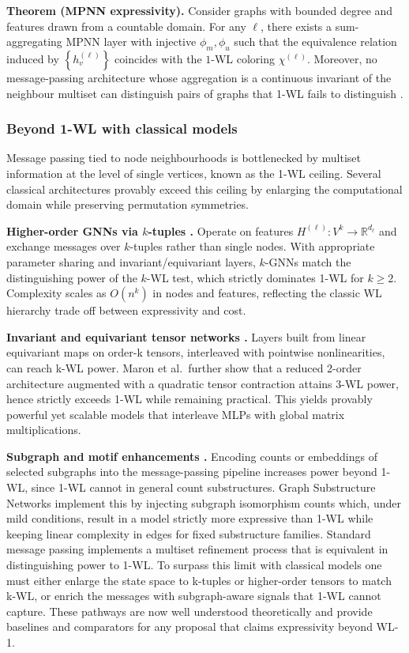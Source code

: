 \documentclass[11pt]{article}
\begin{document}
\textbf{Theorem (MPNN expressivity)\citep{xu2019howpowerful,morris2019wl}.} Consider graphs with bounded degree and features drawn from a countable domain. For any $\ell$, there exists a sum-aggregating MPNN layer with injective $\phi_m, \phi_u$ such that the equivalence relation induced by $\left\{h_v^{(\ell)}\right\}$ coincides with the $1$-WL coloring $\chi^{(\ell)}$. Moreover, no message-passing architecture whose aggregation is a continuous invariant of the neighbour multiset can distinguish pairs of graphs that 1-WL fails to distinguish .

\subsubsection{Beyond 1-WL with classical models}

Message passing tied to node neighbourhoods is bottlenecked by multiset information at the level of single vertices, known as the 1-WL ceiling. Several classical architectures provably exceed this ceiling by enlarging the computational domain while preserving permutation symmetries.

\textbf{Higher-order GNNs via $k$-tuples \citep{morris2019wl}.} Operate on features $H^{(\ell)}: V^k \rightarrow \mathbb{R}^{d_{\ell}}$ and exchange messages over $k$-tuples rather than single nodes. With appropriate parameter sharing and invariant/equivariant layers, $k$-GNNs match the distinguishing power of the $k$-WL test, which strictly dominates 1-WL for $k \geq 2$. Complexity scales as $O\left(n^k\right)$ in nodes and features, reflecting the classic WL hierarchy trade off between expressivity and cost. 

\textbf{Invariant and equivariant tensor networks \citep{maron2019invariant,maron2019provably}.} Layers built from linear equivariant maps on order-k tensors, interleaved with pointwise nonlinearities, can reach k-WL power. Maron et al.\ further show that a reduced 2-order architecture augmented with a quadratic tensor contraction attains 3-WL power, hence strictly exceeds 1-WL while remaining practical. This yields provably powerful yet scalable models that interleave MLPs with global matrix multiplications.

\textbf{Subgraph and motif enhancements \citep{murphy2019relational,zhou2023fromrp}.} Encoding counts or embeddings of selected subgraphs into the message-passing pipeline increases power beyond 1-WL, since 1-WL cannot in general count substructures. Graph Substructure Networks implement this by injecting subgraph isomorphism counts which, under mild conditions, result in a model strictly more expressive than 1-WL while keeping linear complexity in edges for fixed substructure families.
Standard message passing implements a multiset refinement process that is equivalent in distinguishing power to 1-WL. To surpass this limit with classical models one must either enlarge the state space to k-tuples or higher-order tensors to match k-WL, or enrich the messages with subgraph-aware signals that 1-WL cannot capture. These pathways are now well understood theoretically and provide baselines and comparators for any proposal that claims expressivity beyond WL-1.
\end{document}

